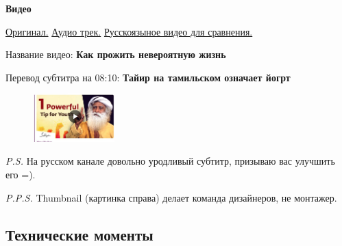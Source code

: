 \documentclass[
a4paper, %
12pt, %
article,
onecolumn, %
openany, %
]{memoir}
\begin{document}
\begin{center} \textbf{Видео} \end{center}
\href{https://www.youtube.com/watch?v=9sGJUR7stzc}{Оригинал.}
\quad
\href{https://drive.google.com/file/d/1Y6ECjMSvkaUFmNawIePfFvqS2ZnB3SPi/view?usp=sharing}{Аудио трек.}
\quad
\href{https://www.youtube.com/watch?v=Q3NYDF4JyTg}{Русскоязыное видео для сравнения.}

Название видео: \textbf{Как прожить невероятную жизнь}
	
Перевод субтитра на 08:10: \textbf{Тайир на тамильском означает йогрт}


\begin{figure}
  \begin{center}
    \includegraphics[width=0.28\textwidth]{thumbnail}
  \end{center}
\end{figure}

\emph{P.S.} На русском канале довольно уродливый субтитр, призываю вас улучшить его =).

\emph{P.P.S.} Thumbnail (картинка справа) делает команда дизайнеров, не монтажер.
 

\newpage
\subsection{Технические моменты}
\end{document}
